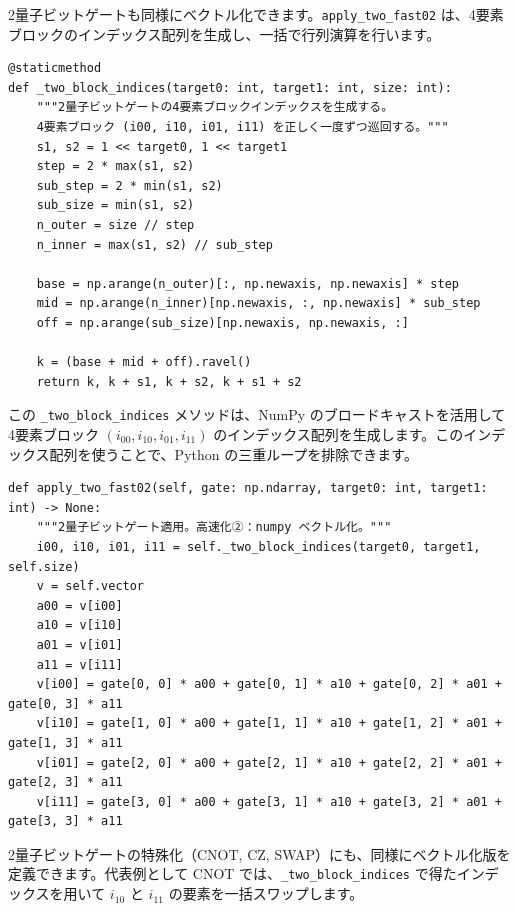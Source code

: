 2量子ビットゲートも同様にベクトル化できます。\texttt{apply\_two\_fast02} は、4要素ブロックのインデックス配列を生成し、一括で行列演算を行います。

\begin{lstlisting}[caption=\_two\_block\_indices：4要素ブロックのインデックス生成（qubit.py）, label=src:two_block_indices]
@staticmethod
def _two_block_indices(target0: int, target1: int, size: int):
    """2量子ビットゲートの4要素ブロックインデックスを生成する。
    4要素ブロック (i00, i10, i01, i11) を正しく一度ずつ巡回する。"""
    s1, s2 = 1 << target0, 1 << target1
    step = 2 * max(s1, s2)
    sub_step = 2 * min(s1, s2)
    sub_size = min(s1, s2)
    n_outer = size // step
    n_inner = max(s1, s2) // sub_step

    base = np.arange(n_outer)[:, np.newaxis, np.newaxis] * step
    mid = np.arange(n_inner)[np.newaxis, :, np.newaxis] * sub_step
    off = np.arange(sub_size)[np.newaxis, np.newaxis, :]

    k = (base + mid + off).ravel()
    return k, k + s1, k + s2, k + s1 + s2
\end{lstlisting}

この \texttt{\_two\_block\_indices} メソッドは、NumPy のブロードキャストを活用して4要素ブロック $(i_{00}, i_{10}, i_{01}, i_{11})$ のインデックス配列を生成します。このインデックス配列を使うことで、Python の三重ループを排除できます。

\begin{lstlisting}[caption=apply\_two\_fast02：2量子ビットゲートのベクトル化（qubit.py）, label=src:apply_two_fast02]
def apply_two_fast02(self, gate: np.ndarray, target0: int, target1: int) -> None:
    """2量子ビットゲート適用。高速化②：numpy ベクトル化。"""
    i00, i10, i01, i11 = self._two_block_indices(target0, target1, self.size)
    v = self.vector
    a00 = v[i00]
    a10 = v[i10]
    a01 = v[i01]
    a11 = v[i11]
    v[i00] = gate[0, 0] * a00 + gate[0, 1] * a10 + gate[0, 2] * a01 + gate[0, 3] * a11
    v[i10] = gate[1, 0] * a00 + gate[1, 1] * a10 + gate[1, 2] * a01 + gate[1, 3] * a11
    v[i01] = gate[2, 0] * a00 + gate[2, 1] * a10 + gate[2, 2] * a01 + gate[2, 3] * a11
    v[i11] = gate[3, 0] * a00 + gate[3, 1] * a10 + gate[3, 2] * a01 + gate[3, 3] * a11
\end{lstlisting}

2量子ビットゲートの特殊化（CNOT, CZ, SWAP）にも、同様にベクトル化版を定義できます。代表例として CNOT では、\texttt{\_two\_block\_indices} で得たインデックスを用いて $i_{10}$ と $i_{11}$ の要素を一括スワップします。

